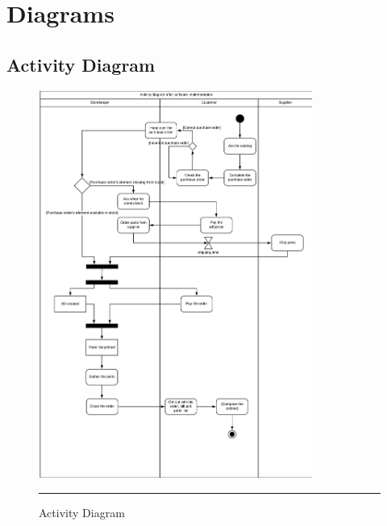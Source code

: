 \newpage
\section{Diagrams}
\label{diagrams}
    \subsection{Activity Diagram}
        \vfill
        \begin{figure}[h!]
            \centering
			\includegraphics[width =0.8\textwidth]{Figures/ActivityDiagram.png}
			\rule{35em}{0.5pt}
			\caption{Activity Diagram}
			\label{activitydiagram}
    	\end{figure}
        \vfill
        
    \newpage
